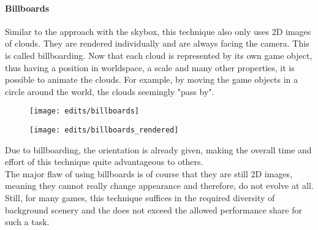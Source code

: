 \paragraph{Billboards}
Similar to the approach with the skybox, this technique also only uses 2D images of clouds. They are rendered individually and are always facing the camera. This is called \gls{billboard}ing.
Now that each cloud is represented by its own game object, thus having a position in \gls{worldspace}, a scale and many other properties, it is possible to animate the clouds. For example, by moving the game objects in a circle around the world, the clouds seemingly "pass by".
\begin{figure}[H]
    \centering
        \begin{minipage}{0.48\linewidth}
            \texttt{[image: edits/billboards]}
            \label{img:edits:billboards}
        \end{minipage}
    \hfill
        \begin{minipage}{0.45\linewidth}
            \texttt{[image: edits/billboards\_rendered]}
            \label{img:edits:billboards_rendered}
        \end{minipage}
\end{figure}
\noindent
Due to billboarding, the orientation is already given, making the overall time and effort of this technique quite advantageous to others.
\\
The major flaw of using billboards is of course that they are still 2D images, meaning they cannot really change appearance and therefore, do not evolve at all. 
Still, for many games, this technique suffices in the required diversity of background scenery and the does not exceed the allowed performance share for such a task.

